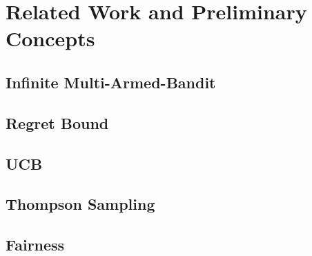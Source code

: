 \section{Related Work and Preliminary Concepts}

\subsection{Infinite Multi-Armed-Bandit}

\subsection{Regret Bound}
\subsection{UCB}
\subsection{Thompson Sampling}

\subsection{Fairness}